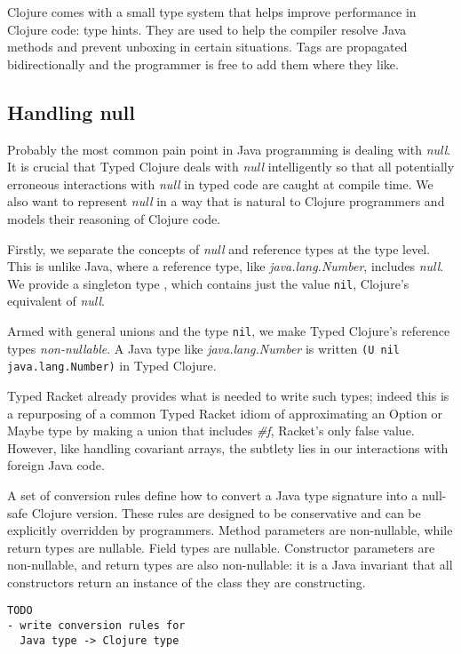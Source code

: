 Clojure comes with a small type system that helps improve
performance in Clojure code: type hints. They are used to help
the compiler resolve Java methods and prevent unboxing in
certain situations. Tags are propagated bidirectionally
and the programmer is free to add them where they like.

\subsection{Handling null}
\label{sec:null}

Probably the most common pain point in Java programming is dealing with \emph{null}.
It is crucial that Typed Clojure deals with \emph{null} intelligently so that
all potentially erroneous interactions with \emph{null} in typed code are caught at compile time.
We also want to represent \emph{null} in a way that is natural to Clojure programmers
and models their reasoning of Clojure code.

Firstly, we separate the concepts of \emph{null} and reference types at the type level.
This is unlike Java, where a reference type, like \emph{java.lang.Number}, includes \emph{null}.
We provide a singleton type \Nil{}, which contains just the value \lstinline|nil|,
Clojure's equivalent of \emph{null}. 

Armed with general unions and the type \lstinline|nil|, 
we make Typed Clojure's reference types \emph{non-nullable}.
A Java type like \emph{java.lang.Number} is written \lstinline|(U nil java.lang.Number)|
in Typed Clojure.

Typed Racket already provides what is needed to write such types; indeed this is a repurposing
of a common Typed Racket idiom of approximating an Option or Maybe type by
making a union that includes \emph{\#f}, Racket's only false value.
However, like handling covariant arrays, the subtlety lies in our interactions with foreign
Java code.

A set of conversion rules define how to convert a Java type signature into a null-safe
Clojure version. These rules are designed to be conservative and can be explicitly overridden
by programmers. Method parameters are non-nullable, while return types are nullable.
Field types are nullable. Constructor parameters are non-nullable, and return types
are also non-nullable: it is a Java invariant that all constructors return an instance
of the class they are constructing.

\begin{verbatim}
TODO 
- write conversion rules for 
  Java type -> Clojure type
\end{verbatim}


